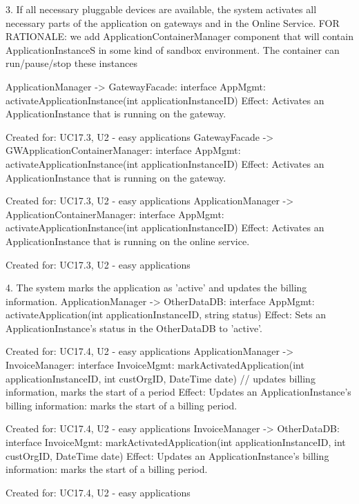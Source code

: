 {{{            3. If all necessary pluggable devices are available, the system activates all necessary parts of the application on gateways and in the Online Service.
                FOR RATIONALE: we add ApplicationContainerManager component that will contain ApplicationInstanceS in some kind of sandbox environment. The container can run/pause/stop these instances

                ApplicationManager -> GatewayFacade:        interface AppMgmt: activateApplicationInstance(int applicationInstanceID)
                    Effect: Activates an ApplicationInstance that is running on the gateway.
                    \item Created for: UC17.3, U2 - easy applications
                GatewayFacade -> GWApplicationContainerManager:    interface AppMgmt: activateApplicationInstance(int applicationInstanceID)
                    Effect: Activates an ApplicationInstance that is running on the gateway.
                    \item Created for: UC17.3, U2 - easy applications
                ApplicationManager -> ApplicationContainerManager: interface AppMgmt: activateApplicationInstance(int applicationInstanceID)
                    Effect: Activates an ApplicationInstance that is running on the online service.
                    \item Created for: UC17.3, U2 - easy applications

            4. The system marks the application as 'active' and updates the billing information.
                ApplicationManager -> OtherDataDB:    interface AppMgmt:     activateApplication(int applicationInstanceID, string status)
                    Effect: Sets an ApplicationInstance's status in the OtherDataDB to 'active'.
                    \item Created for: UC17.4, U2 - easy applications
                ApplicationManager -> InvoiceManager: interface InvoiceMgmt: markActivatedApplication(int applicationInstanceID, int custOrgID, DateTime date) // updates billing information, marks the start of a period
                    Effect: Updates an ApplicationInstance's billing information: marks the start of a billing period.
                    \item Created for: UC17.4, U2 - easy applications
                InvoiceManager -> OtherDataDB:        interface InvoiceMgmt: markActivatedApplication(int applicationInstanceID, int custOrgID, DateTime date)
                    Effect: Updates an ApplicationInstance's billing information: marks the start of a billing period.
                    \item Created for: UC17.4, U2 - easy applications

}}}
